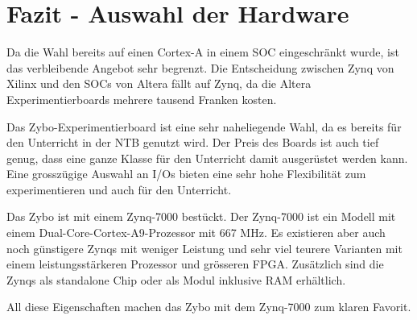 


\section{Fazit - Auswahl der Hardware}
Da die Wahl bereits auf einen Cortex-A in einem SOC eingeschränkt wurde, ist das verbleibende Angebot sehr begrenzt.
Die Entscheidung zwischen Zynq von Xilinx und den SOCs von Altera fällt auf Zynq, da die Altera Experimentierboards mehrere tausend Franken kosten.

Das Zybo-Experimentierboard ist eine sehr naheliegende Wahl, da es bereits für den Unterricht in der NTB genutzt wird.
Der Preis des Boards ist auch tief genug, dass eine ganze Klasse für den Unterricht damit ausgerüstet werden kann.
Eine grosszügige Auswahl an I/Os bieten eine sehr hohe Flexibilität zum experimentieren und auch für den Unterricht.

Das Zybo ist mit einem Zynq-7000 bestückt.
Der Zynq-7000 ist ein Modell mit einem Dual-Core-Cortex-A9-Prozessor mit 667 MHz.
Es existieren aber auch noch günstigere Zynqs mit weniger Leistung und sehr viel teurere Varianten mit einem leistungsstärkeren Prozessor und grösseren FPGA.
Zusätzlich sind die Zynqs als standalone Chip oder als Modul inklusive RAM erhältlich.

All diese Eigenschaften machen das Zybo mit dem Zynq-7000 zum klaren Favorit.


